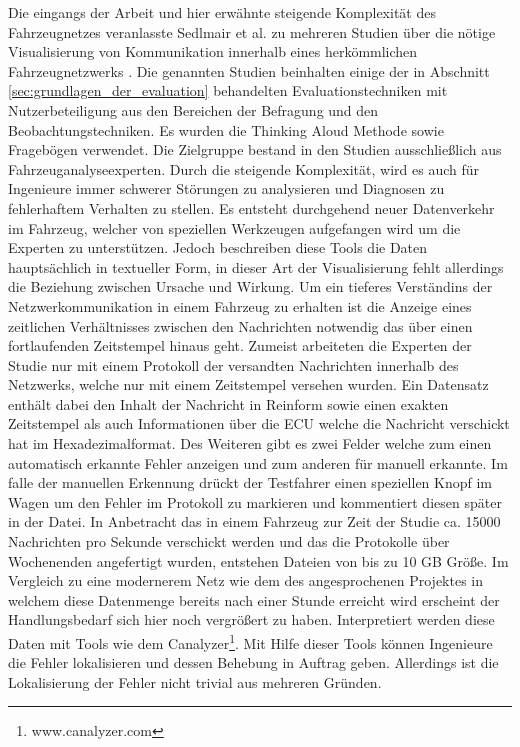\documentclass[draft=false
              ,paper=a4
              ,twoside=false
              ,fontsize=11pt
              ,headsepline
              ,BCOR10mm
              ,DIV11
              ]{scrbook}
\newcommand{\TODO}[1]{\colorbox{yellow}{\textcolor{red}{[TODO: #1]}}}
\begin{document}
Die eingangs der Arbeit und hier erwähnte steigende Komplexität des Fahrzeugnetzes veranlasste Sedlmair et al. zu mehreren Studien über die nötige Visualisierung von Kommunikation innerhalb eines herkömmlichen Fahrzeugnetzwerks \cite{sedlmair2009}\cite{sedlmair_dual-view_2008}. Die genannten Studien beinhalten einige der in Abschnitt \ref{sec:grundlagen_der_evaluation} behandelten Evaluationstechniken mit Nutzerbeteiligung aus den Bereichen der Befragung und den Beobachtungstechniken. Es wurden die Thinking Aloud Methode sowie Fragebögen verwendet. Die Zielgruppe bestand in den Studien ausschließlich aus Fahrzeuganalyseexperten. Durch die steigende Komplexität, wird es auch für Ingenieure immer schwerer Störungen zu analysieren und Diagnosen zu fehlerhaftem Verhalten zu stellen. Es entsteht durchgehend neuer Datenverkehr im Fahrzeug, welcher von speziellen Werkzeugen aufgefangen wird um die Experten zu unterstützen. Jedoch beschreiben diese Tools die Daten hauptsächlich in textueller Form, in dieser Art der Visualisierung fehlt allerdings die Beziehung zwischen Ursache und Wirkung. Um ein tieferes Verständins der Netzwerkommunikation in einem Fahrzeug zu erhalten ist die Anzeige eines zeitlichen Verhältnisses zwischen den Nachrichten notwendig das über einen fortlaufenden Zeitstempel hinaus geht. Zumeist arbeiteten die Experten der Studie nur mit einem Protokoll der versandten Nachrichten innerhalb des Netzwerks, welche nur mit einem Zeitstempel versehen wurden. Ein Datensatz enthält dabei den Inhalt der Nachricht in Reinform sowie einen exakten Zeitstempel als auch Informationen über die ECU welche die Nachricht verschickt hat im Hexadezimalformat. Des Weiteren gibt es zwei Felder welche zum einen automatisch erkannte Fehler anzeigen und zum anderen für manuell erkannte. Im falle der manuellen Erkennung drückt der Testfahrer einen speziellen Knopf im Wagen um den Fehler im Protokoll zu markieren und kommentiert diesen später in der Datei. In Anbetracht das in einem Fahrzeug zur Zeit der Studie ca. 15000 Nachrichten pro Sekunde verschickt werden und das die Protokolle über Wochenenden angefertigt wurden, entstehen Dateien von bis zu 10 GB Größe. Im Vergleich zu eine modernerem Netz wie dem des angesprochenen Projektes in welchem diese Datenmenge bereits nach einer Stunde erreicht wird erscheint der Handlungsbedarf sich hier noch vergrößert zu haben. Interpretiert werden diese Daten mit Tools wie dem Canalyzer\footnote{www.canalyzer.com}. Mit Hilfe dieser Tools können Ingenieure die Fehler lokalisieren und dessen Behebung in Auftrag geben. Allerdings ist die Lokalisierung der Fehler nicht trivial aus mehreren Gründen. 
\end{document}
